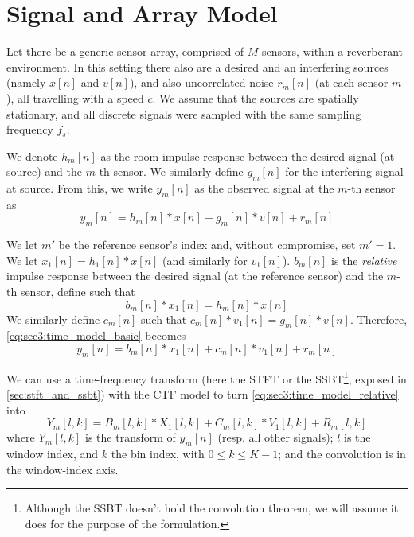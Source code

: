 \section{Signal and Array Model}
\label{sec:signal_model}

Let there be a generic sensor array, comprised of $M$ sensors, within a reverberant environment. In this setting there also are a desired and an interfering sources (namely $x[n]$ and $v[n]$), and also uncorrelated noise $r_m[n]$ (at each sensor $m$), all travelling with a speed $c$. We assume that the sources are spatially stationary, and all discrete signals were sampled with the same sampling frequency $f_s$.

We denote $h_m[n]$ as the room impulse response between the desired signal (at source) and the $m$-th sensor. We similarly define $g_m[n]$ for the interfering signal at source. From this, we write $y_m[n]$ as the observed signal at the $m$-th sensor as
\begin{equation}
	\label{eq:sec3:time_model_basic}
	y_m[n] = h_m[n] \ast x[n] + g_m[n] \ast v[n] + r_m[n]
\end{equation}

We let $m'$ be the reference sensor's index and, without compromise, set $m'=1$. We let $x_1[n] = h_1[n] \ast x[n]$ (and similarly for $v_1[n]$). $b_m[n]$ is the \textit{relative} impulse response between the desired signal (at the reference sensor) and the $m$-th sensor, define such that
\begin{equation}
	b_m[n] \ast x_1[n] = h_m[n] \ast x[n]
\end{equation}
We similarly define $c_m[n]$ such that $c_m[n] \ast v_1[n] = g_m[n] \ast v[n]$. Therefore, \cref{eq:sec3:time_model_basic} becomes
\begin{equation}
	\label{eq:sec3:time_model_relative}
	y_m[n] = b_m[n] \ast x_1[n] + c_m[n] \ast v_1[n] + r_m[n]
\end{equation}

We can use a time-frequency transform (here the STFT or the SSBT\footnote{Although the SSBT doesn't hold the convolution theorem, we will assume it does for the purpose of the formulation.}, exposed in \cref{sec:stft_and_ssbt}) with the CTF model \cite{talmon_relative_2009} to turn \cref{eq:sec3:time_model_relative} into
\begin{equation}
	\label{eq:sec3:time-freq_model_conv}
	Y_m[l,k] = B_m[l,k] \ast X_1[l,k] + C_m[l,k] \ast V_1[l,k] + R_m[l,k]
\end{equation}
where $Y_m[l,k]$ is the transform of $y_m[n]$ (resp. all other signals); $l$ is the window index, and $k$ the bin index, with $0 \leq k \leq K-1$; and the convolution is in the window-index axis.

